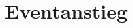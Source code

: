 \section{Eventanstieg}
\begin{comment}
  
Der Anstieg des Entladestroms lässt sich durch ein exponentielles Modell beschreiben:
\begin{equation}
    A e^{\frac{t}{\tau}} + C
\end{equation}
Somit lässt sich aus einem solchen fit insbesondere die Anstiegszeit \(\tau\) bestimmen und untersuchen wie sich diese unter verschiedenen Bedingungen verändert. In \figref{fig:start-fit-t} ist die Verteilung der \(\tau\) dargestllt, die sich aus den fits für die verschiedenen Entladungen ergibt. Somit liegen diese in einem Bereich von \SIrange{0,1}{100}{\nano\second} mit Ausreißern, die auf schlechte fits bzw. Ausreißer in den Daten hindeuten. A liegt in dem Interval \SIrange{1}{100}{\micro\ampere} und C in \SIrange{0,1}{100}{\micro\ampere}. In \figref{fig:start-fit-score} ist die Verteilung der scores des fits Verteilt, also wie genau der fit die Daten wiedergibt. Dabei ist zuerkennen, dass der Großteil der Daten sehr gut wiedergegeben wird, es jedoch wenige aber starte Ausreißer gibt, für die der Fit jedoch sehr ungenau ist. Die großem inetwa Normalverteilten Intervale für \(\tau\), A und C entsprechen fits mit einem guten score von über \(0.95\). Aus diesen Intervalen für die Parameter der fits der Entladungen sind mehrer Schlüsse zuziehen. Das C entspricht dem Stromversatz entlang der y-Achse also in dem Fall des Stromanstiegs dem Startstrom \(I_0\). Somit liegen Ströme von einigen \(\mu A\) vor der Entladung vor, diese lassen sich für die höheren Ströme durch die vor der Entladung auftretenden Vorevents wie in \figref{fig:discharge-vor-lang-1} erklären und für die kleineren Ströme können dies Vorevents wie wie in \figref{fig:discharge-vor-mittel-1} sein, die den mittleren Startstrom etwas verschieben und die kleinen \SI{0,1}{\micro\ampere} Ströme lässt sich das durch Rauschen oder auch einem schlecht gewählten fit Interval erklären. In den Abbildungen \ref{fig:start-fit-scatter-gap} bis \ref{fig:start-fit-scatter-u} sind jeweils der Spaltabstand \(d\), der Druck \(p\) und die Durchbruchspannung \(U_B\) gegen \(\tau\) aufgetragen. Es zeigt sich für die \(\tau\) die im Interval mit hohen score liegen, dass die Anstiegszeit nicht linear von diesen Parametern abhängt. Somit sind die Anstiegszeiten uniform über die Paschenkurve verteilt, dies ist ebenfalls in \figref{fig:start-fit-tau-pd} zu sehen.


\end{comment}

